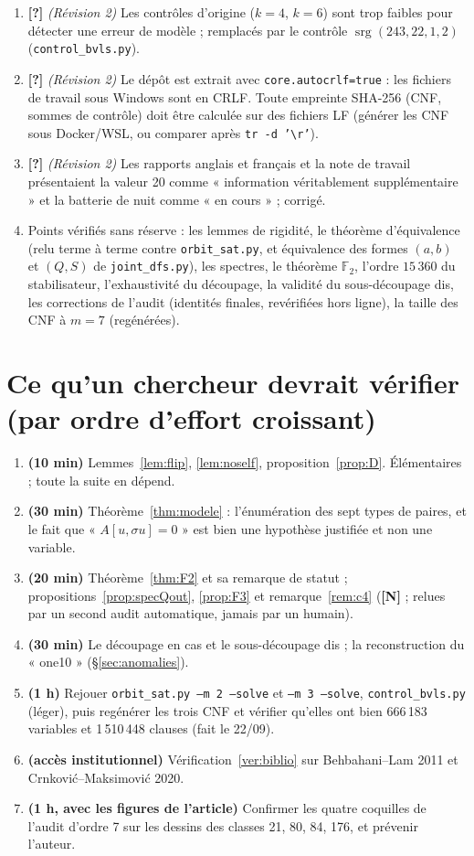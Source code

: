 \documentclass[11pt,a4paper]{article}
\theoremstyle{definition}
\theoremstyle{remark}
\newcommand{\F}{\mathbb{F}}
\newcommand{\srg}{\operatorname{srg}}
\newcommand{\st}[1]{\textbf{[#1]}}
\newcommand{\code}[1]{\texttt{#1}}
\begin{document}
\begin{enumerate}[nosep]
\item \st{?} \emph{(Révision 2)} Les contrôles d'origine ($k=4$, $k=6$) sont trop faibles pour détecter une erreur de modèle ; remplacés par le contrôle $\srg(243,22,1,2)$ (\code{control\_bvls.py}).
\item \st{?} \emph{(Révision 2)} Le dépôt est extrait avec \code{core.autocrlf=true} : les fichiers de travail sous Windows sont en CRLF. Toute empreinte SHA-256 (CNF, sommes de contrôle) doit être calculée sur des fichiers LF (générer les CNF sous Docker/WSL, ou comparer après \code{tr -d '\textbackslash r'}).
\item \st{?} \emph{(Révision 2)} Les rapports anglais et français et la note de travail présentaient la valeur 20 comme « information véritablement supplémentaire » et la batterie de nuit comme « en cours » ; corrigé.
\item Points vérifiés sans réserve : les lemmes de rigidité, le théorème d'équivalence (relu terme à terme contre \code{orbit\_sat.py}, et équivalence des formes $(a,b)$ et $(Q,S)$ de \code{joint\_dfs.py}), les spectres, le théorème $\F_2$, l'ordre $15\,360$ du stabilisateur, l'exhaustivité du découpage, la validité du sous-découpage dis, les corrections de l'audit (identités finales, revérifiées hors ligne), la taille des CNF à $m=7$ (regénérées).
\end{enumerate}

\section{Ce qu'un chercheur devrait vérifier (par ordre d'effort croissant)}\label{sec:verif}
\begin{enumerate}[nosep]
\item \textbf{(10 min)} Lemmes~\ref{lem:flip}, \ref{lem:noself}, proposition~\ref{prop:D}. Élémentaires ; toute la suite en dépend.
\item \textbf{(30 min)} Théorème~\ref{thm:modele} : l'énumération des sept types de paires, et le fait que « $A[u,\sigma u]=0$ » est bien une hypothèse justifiée et non une variable.
\item \textbf{(20 min)} Théorème~\ref{thm:F2} et sa remarque de statut ; propositions~\ref{prop:specQout}, \ref{prop:F3} et remarque~\ref{rem:c4} (\st{N} ; relues par un second audit automatique, jamais par un humain).
\item \textbf{(30 min)} Le découpage en cas et le sous-découpage dis ; la reconstruction du « one10 » (§\ref{sec:anomalies}).
\item \textbf{(1 h)} Rejouer \code{orbit\_sat.py --m 2 --solve} et \code{--m 3 --solve}, \code{control\_bvls.py} (léger), puis regénérer les trois CNF et vérifier qu'elles ont bien 666\,183 variables et 1\,510\,448 clauses (fait le 22/09).
\item \textbf{(accès institutionnel)} Vérification~\ref{ver:biblio} sur Behbahani--Lam 2011 et Crnković--Maksimović 2020.
\item \textbf{(1 h, avec les figures de l'article)} Confirmer les quatre coquilles de l'audit d'ordre 7 sur les dessins des classes 21, 80, 84, 176, et prévenir l'auteur.
\end{enumerate}
\end{document}
